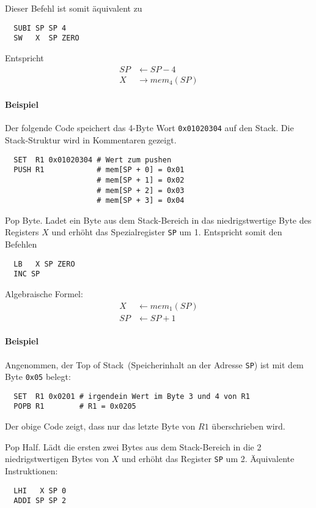 Dieser Befehl ist somit äquivalent zu 
\begin{lstlisting}
  SUBI SP SP 4
  SW   X  SP ZERO
\end{lstlisting}
Entspricht
\begin{align*}
  SP & \gets SP - 4    \\
  X  & \to mem_{4}(SP)
\end{align*}

\paragraph{Beispiel}
Der folgende Code speichert das 4-Byte Wort \texttt{0x01020304} auf den Stack.
Die Stack-Struktur wird in Kommentaren gezeigt.
\begin{lstlisting}
  SET  R1 0x01020304 # Wert zum pushen
  PUSH R1            # mem[SP + 0] = 0x01
                     # mem[SP + 1] = 0x02
                     # mem[SP + 2] = 0x03
                     # mem[SP + 3] = 0x04
\end{lstlisting}




\glqq Pop Byte\grqq.
Ladet ein Byte aus dem Stack-Bereich in das niedrigstwertige Byte des Registers
$X$ und erhöht das Spezialregister \texttt{SP} um 1.
Entspricht somit den Befehlen 
\begin{lstlisting}
  LB   X SP ZERO
  INC SP
\end{lstlisting}
Algebraische Formel:
\begin{align*}
  X  & \gets mem_{1}(SP) \\
  SP & \gets SP + 1
\end{align*}

\paragraph{Beispiel}
Angenommen, der \glqq Top of Stack\grqq\ (Speicherinhalt an der Adresse
\texttt{SP}) ist mit dem Byte \texttt{0x05} belegt:
\begin{lstlisting}
  SET  R1 0x0201 # irgendein Wert im Byte 3 und 4 von R1
  POPB R1        # R1 = 0x0205
\end{lstlisting}
Der obige Code zeigt, dass nur das letzte Byte von $R1$ überschrieben wird.


\glqq Pop Half\grqq.
Lädt die ersten zwei Bytes aus dem Stack-Bereich in die 2 niedrigstwertigen
Bytes von $X$ und erhöht das Register \texttt{SP} um 2.
Äquivalente Instruktionen:
\begin{lstlisting}
  LHI   X SP 0
  ADDI SP SP 2
\end{lstlisting}

